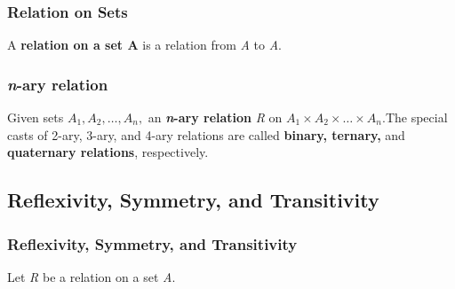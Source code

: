 \documentclass[12pt]{article}
\begin{document}
\subsubsection*{Relation on Sets}
A \textbf{relation on a set A} is a relation from \textit{A} to \textit{A}.

\subsubsection*{\textit{n}-ary relation}
Given sets $A_1, A_2, \ldots, A_n,$ an \textbf{\textit{n}-ary relation} \textit{R} on $A_1 \times A_2 \times \ldots \times A_n$.The special casts of 2-ary, 3-ary, and 4-ary relations are called \textbf{binary, ternary,} and \textbf{quaternary relations}, respectively.

\subsection{Reflexivity, Symmetry, and Transitivity}
\subsubsection*{Reflexivity, Symmetry, and Transitivity}
Let \textit{R} be a relation on a set \textit{A}.
\end{document}
